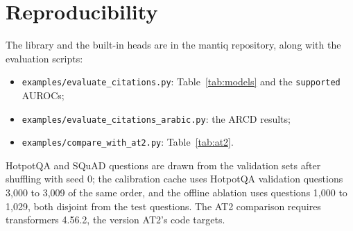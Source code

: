 \documentclass[11pt]{article}
\begin{document}
\section{Reproducibility}
\label{app:repro}

The library and the built-in heads are in the mantiq repository, along with the evaluation scripts:
\begin{itemize}
\item \nolinkurl{examples/evaluate_citations.py}: Table~\ref{tab:models} and the \texttt{supported} AUROCs;
\item \nolinkurl{examples/evaluate_citations_arabic.py}: the ARCD results;
\item \nolinkurl{examples/compare_with_at2.py}: Table~\ref{tab:at2}.
\end{itemize} HotpotQA and SQuAD questions are drawn from the validation sets after shuffling with seed 0; the calibration cache uses HotpotQA validation questions 3{,}000 to 3{,}009 of the same order, and the offline ablation uses questions 1{,}000 to 1{,}029, both disjoint from the test questions. The AT2 comparison requires transformers 4.56.2, the version AT2's code targets.
\end{document}
